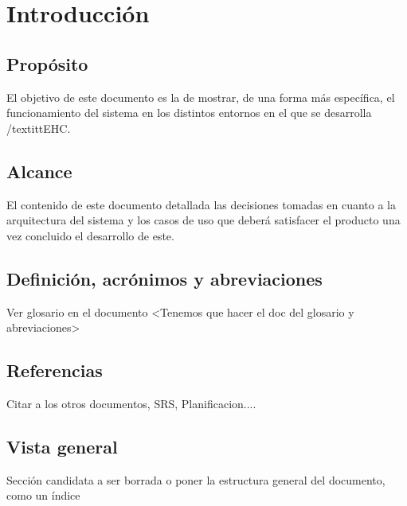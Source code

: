 \chapter{Introducción}
\section{Propósito}
El objetivo de este documento es la de mostrar, de una forma más específica, el funcionamiento del sistema en los distintos entornos en el que se desarrolla /textitt{EHC}. 
\section{Alcance}
El contenido de este documento detallada las decisiones tomadas en cuanto a la arquitectura del sistema y los casos de uso que deberá satisfacer el producto una vez concluido el desarrollo de este.
\section{Definición, acrónimos y abreviaciones}
Ver glosario en el documento <Tenemos que hacer el doc del glosario y abreviaciones>
\section{Referencias}
Citar a los otros documentos, SRS, Planificacion....
\section{Vista general}
Sección candidata a ser borrada o poner la estructura general del documento, como un índice